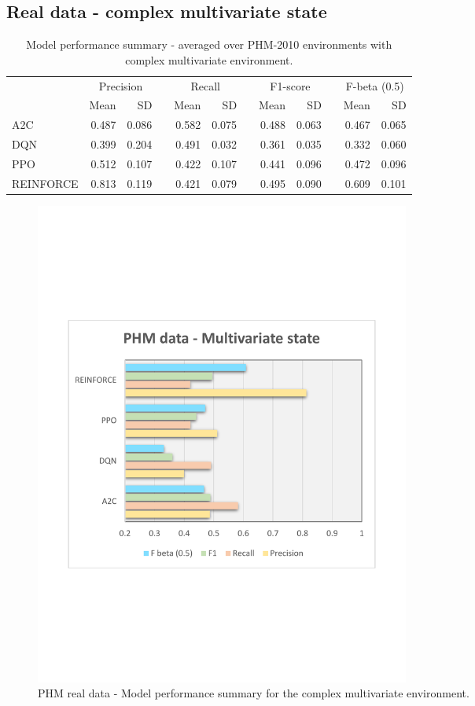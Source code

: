 \documentclass[a4paper, 12pt]{article}
\newcommand{\rowspace}[1]{\renewcommand{\arraystretch}{#1}}
\begin{document}
\subsection{Real data - complex multivariate state}
\begin{table}[!htb]\centering
	\sffamily
	\rowspace{1.3}
	\begin{tabular}{@{}l rr c rr c rr c rr@{}}
		\arrayrulecolor{black!40}\toprule
		& \multicolumn{2}{c}{Precision} & \phantom{i} & \multicolumn{2}{c}{Recall} & \phantom{i} & \multicolumn{2}{c}{F1-score} & \phantom{i} & \multicolumn{2}{c}{F-beta (0.5)} \\
		\cmidrule{2-3} \cmidrule{5-6} \cmidrule{8-9} \cmidrule{11-12} 
		
		&Mean &SD & &Mean &SD & &Mean &SD& &Mean & SD\\ \midrule
		A2C & 0.487 & 0.086 & &\textcolor{dblue}{0.582} & 0.075 & & 0.488 & 0.063 & &0.467 &0.065 \\
		DQN & 0.399 & 0.204 & &0.491 & 0.032 & & 0.361 & 0.035 & &0.332 &0.060 \\
		PPO & 0.512 & 0.107 & &0.422 & 0.107 & & 0.441 & 0.096 & &0.472 &0.096 \\
		REINFORCE & \textcolor{dblue}{0.813} & 0.119 & &0.421 & 0.079 & & \textcolor{dblue}{0.495} & 0.090 & &\textcolor{dblue}{0.609} &0.101 \\
		\bottomrule
	\end{tabular}
	\caption{Model performance summary - averaged over PHM-2010 environments with complex multivariate environment.}
	\label{tbl:PHMMS}
\end{table}
\begin{figure}[h]
	\centering
	\includegraphics[width=0.6\textwidth, trim={1.5cm 7cm 1cm 7cm}]{images/PHMMSPlot.pdf}  
	\caption{PHM real data - Model performance summary for the complex multivariate environment.}
	\label{fig:PHMMS}
\end{figure}
\end{document}

